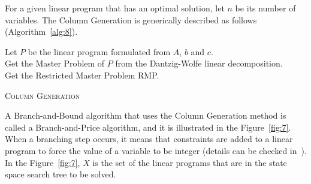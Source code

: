 \documentclass[fleqn,10pt]{SelfArx} %
\begin{document}
	For a given linear program that has an optimal solution, let $n$ be
	its number of variables. The Column Generation is generically
	described as follows (Algorithm~\ref{alg:8}).
	
	\begin{algorithm*}[htpb]
		\SetAlgoNoLine
		
		Let $P$ be the linear program formulated from $A$, $b$ and $c$.\\[5pt]
		
		Get the Master Problem of $P$ from the Dantzig-Wolfe linear decomposition.\\[5pt]
		
		Get the Restricted Master Problem RMP.\\[5pt]
		
		\caption{\textsc{Column Generation}}\label{alg:8}
	\end{algorithm*}
	
	A Branch-and-Bound algorithm that uses the Column Generation method is
	called a Branch-and-Price algorithm, and it is illustrated in the
	Figure~\ref{fig:7}. When a branching step occurs, it means that
	constraints are added to a linear program to force the value of a
	variable to be integer (details can be checked in~\cite{MatousekGaertner07}). In the Figure~\ref{fig:7}, $X$ is the set of the
	linear programs that are in the state space search tree to be solved.
	
\end{document}
